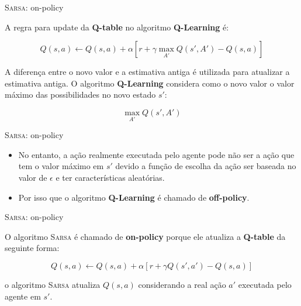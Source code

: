 \documentclass{beamer}
\begin{document}
\begin{frame}{\textsc{Sarsa}: on-policy}
	
	A regra para update da \textbf{Q-table} no algoritmo \textbf{Q-Learning} é: 
	
	\begin{equation}
	Q(s,a) \leftarrow Q(s,a) + \alpha [r +\gamma \max_{A'}{Q(s', A')} - Q(s,a)]
	\end{equation}

	A diferença entre o novo valor e a estimativa antiga é utilizada para atualizar a estimativa antiga. O algoritmo \textbf{Q-Learning} considera como o novo valor o valor máximo das possibilidades no novo estado $s'$: 
	
	\begin{equation}
	\max_{A'}{Q(s', A')}
	\end{equation}
	
\end{frame}


\begin{frame}{\textsc{Sarsa}: on-policy}
	
	\begin{itemize}
		
	\item No entanto, a ação realmente executada pelo agente pode não ser a ação que tem o valor máximo em $s'$ devido a função de escolha da ação ser baseada no valor de $\epsilon$ e ter características aleatórias.
	
	\item Por isso que o algoritmo \textbf{Q-Learning} é chamado de \textbf{off-policy}.   
\end{itemize}
	
\end{frame}


\begin{frame}{\textsc{Sarsa}: on-policy}
	
	O algoritmo \textsc{Sarsa} é chamado de  \textbf{on-policy} porque ele atualiza a \textbf{Q-table} da seguinte forma: 
	
	\begin{equation}
		Q(s,a) \leftarrow Q(s,a) + \alpha [r +\gamma Q(s', a') - Q(s,a)]
	\end{equation}
	
	o algoritmo \textsc{Sarsa} atualiza $Q(s,a)$ considerando a real ação $a'$ executada pelo agente em $s'$.
	
\end{frame}

\def\HiLi{\leavevmode\rlap{\hbox to \hsize{\color{yellow!50}\leaders\hrule height .8\baselineskip depth .5ex\hfill}}}
\end{document}
